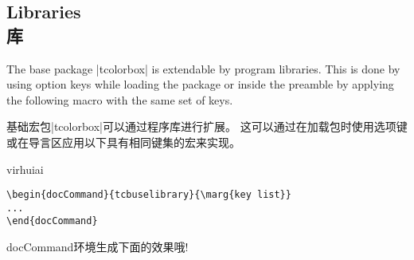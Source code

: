 
\subsection{Libraries\\ 库}\label{sec:bibliothek}

The base package |tcolorbox| is extendable by program libraries.%
This is done by using option keys while loading the package or inside
the preamble by applying the following macro with the same set of keys.


基础宏包|tcolorbox|可以通过程序库进行扩展。%
这可以通过在加载包时使用选项键或在导言区应用以下具有相同键集的宏来实现。



\begin{引述之言}{virhuiai}
\begin{verbatim}
\begin{docCommand}{tcbuselibrary}{\marg{key list}}
...
\end{docCommand}  
\end{verbatim}
docCommand环境生成下面的效果哦!
\end{引述之言}




